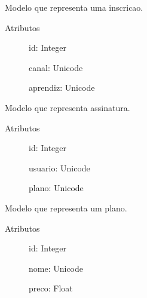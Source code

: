 \documentclass[letterpaper,10pt,english]{sphinxmanual}
\begin{document}
\label{\detokenize{index:module-inscricao}}

\begin{fulllineitems}
\label{\detokenize{index:inscricao.Inscricao}}
Modelo que representa uma inscricao.
\begin{description}
\item[{Atributos}] \leavevmode
id: Integer

canal: Unicode

aprendiz: Unicode

\end{description}

\end{fulllineitems}

\label{\detokenize{index:module-assinatura}}

\begin{fulllineitems}
\label{\detokenize{index:assinatura.Assinatura}}
Modelo que representa assinatura.
\begin{description}
\item[{Atributos}] \leavevmode
id: Integer

usuario: Unicode

plano: Unicode

\end{description}

\end{fulllineitems}

\label{\detokenize{index:module-plano}}

\begin{fulllineitems}
\label{\detokenize{index:plano.Plano}}
Modelo que representa um plano.
\begin{description}
\item[{Atributos}] \leavevmode
id: Integer

nome: Unicode

preco: Float

\end{description}

\end{fulllineitems}
\end{document}

